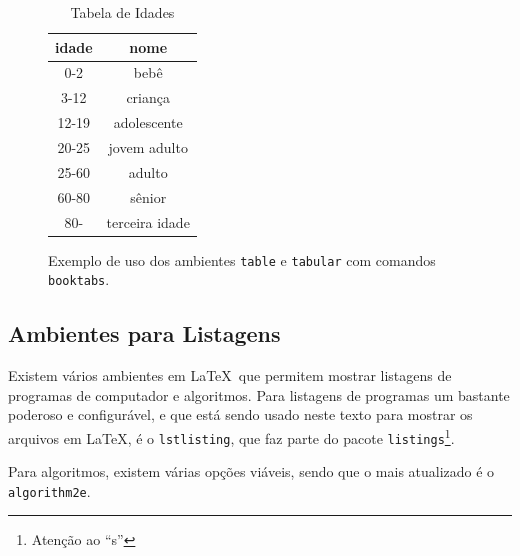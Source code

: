 \begin{figure}
    \begin{LTXexample}[pos=b]
\begin{table}
    \caption{Tabela de Idades}
    \centering
    \label{tab:idades}
    \begin{tabular}{cc}
        \toprule
        \textbf{idade} & \textbf{nome} \\
        \midrule
        0-2   & bebê \\
        3-12  & criança \\
        12-19 & adolescente \\
        20-25 & jovem adulto \\
        25-60 & adulto \\
        60-80 & sênior \\
        80-   & terceira idade \\
        \bottomrule
    \end{tabular}
\end{table}
    \end{LTXexample}
    \caption{Exemplo de uso dos ambientes \texttt{table} e \texttt{tabular} com comandos \texttt{booktabs}.}
    \label{fig:tabtab1}
\end{figure}


\subsection{Ambientes para Listagens}

Existem vários ambientes em \LaTeX\ que permitem mostrar
listagens de programas de computador e algoritmos.
Para listagens de programas um bastante poderoso e configurável,
e que está sendo usado neste texto para mostrar os arquivos
em \LaTeX, é o \lstinline|lstlisting|\parencite{Heinz:2020}, que faz parte do pacote
\lstinline|listings|\footnote{Atenção ao ``s''}.

Para algoritmos, existem várias opções viáveis, sendo que o mais atualizado é o \lstinline|algorithm2e|\parencite{Fiorio:2017}.














